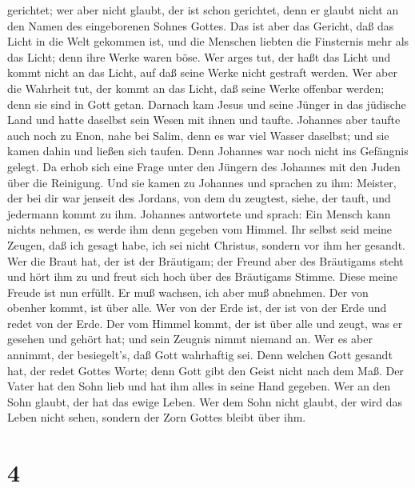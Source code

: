 gerichtet; wer aber nicht glaubt, der ist schon gerichtet, denn er
glaubt nicht an den Namen des eingeborenen Sohnes Gottes. 
Das ist aber das Gericht, daß das Licht in die Welt gekommen ist, und
die Menschen liebten die Finsternis mehr als das Licht; denn ihre Werke
waren böse.  Wer arges tut, der haßt das Licht und kommt
nicht an das Licht, auf daß seine Werke nicht gestraft werden.
 Wer aber die Wahrheit tut, der kommt an das Licht, daß
seine Werke offenbar werden; denn sie sind in Gott getan. 
Darnach kam Jesus und seine Jünger in das jüdische Land und hatte
daselbst sein Wesen mit ihnen und taufte.  Johannes aber
taufte auch noch zu Enon, nahe bei Salim, denn es war viel Wasser
daselbst; und sie kamen dahin und ließen sich taufen.  Denn
Johannes war noch nicht ins Gefängnis gelegt.  Da erhob
sich eine Frage unter den Jüngern des Johannes mit den Juden über die
Reinigung.  Und sie kamen zu Johannes und sprachen zu ihm:
Meister, der bei dir war jenseit des Jordans, von dem du zeugtest,
siehe, der tauft, und jedermann kommt zu ihm.  Johannes
antwortete und sprach: Ein Mensch kann nichts nehmen, es werde ihm denn
gegeben vom Himmel.  Ihr selbst seid meine Zeugen, daß ich
gesagt habe, ich sei nicht Christus, sondern vor ihm her gesandt.
 Wer die Braut hat, der ist der Bräutigam; der Freund aber
des Bräutigams steht und hört ihm zu und freut sich hoch über des
Bräutigams Stimme. Diese meine Freude ist nun erfüllt.  Er
muß wachsen, ich aber muß abnehmen.  Der von obenher kommt,
ist über alle. Wer von der Erde ist, der ist von der Erde und redet von
der Erde. Der vom Himmel kommt, der ist über alle  und
zeugt, was er gesehen und gehört hat; und sein Zeugnis nimmt niemand an.
 Wer es aber annimmt, der besiegelt's, daß Gott wahrhaftig
sei.  Denn welchen Gott gesandt hat, der redet Gottes
Worte; denn Gott gibt den Geist nicht nach dem Maß.  Der
Vater hat den Sohn lieb und hat ihm alles in seine Hand gegeben.
 Wer an den Sohn glaubt, der hat das ewige Leben. Wer dem
Sohn nicht glaubt, der wird das Leben nicht sehen, sondern der Zorn
Gottes bleibt über ihm.

\hypertarget{section-3}{%
\section{4}\label{section-3}}

